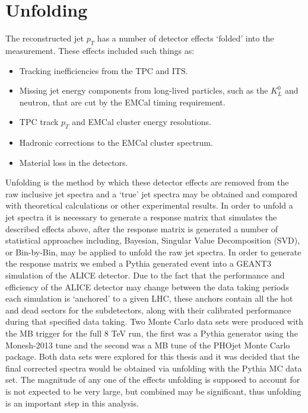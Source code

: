 \section{Unfolding}

The reconstructed jet $p_{T}$ has a number of detector effects `folded' into the measurement.  These effects included such things as:

\begin{itemize}
\item Tracking inefficiencies from the TPC and ITS.
\item Missing jet energy components from long-lived particles, such as the $K^{0}_{L}$ and neutron, that are cut by the EMCal timing requirement.
\item TPC track $p_{T}$ and EMCal cluster energy resolutions.
\item Hadronic corrections to the EMCal cluster spectrum.
\item Material loss in the detectors.
\end{itemize}

\noindent
Unfolding is the method by which these detector effects are removed from the raw inclusive jet spectra and a `true' jet spectra may be obtained and compared with theoretical calculations or other experimental results.  In order to unfold a jet spectra it is necessary to generate a response matrix that simulates the described effects above, after the response matrix is generated a number of statistical approaches including, Bayesian, Singular Value Decomposition (SVD), or Bin-by-Bin, may be applied to unfold the raw jet spectra.  In order to generate the response matrix we embed a Pythia generated event into a GEANT3 simulation of the ALICE detector.  Due to the fact that the performance and efficiency of the ALICE detector may change between the data taking periods each simulation is `anchored' to a given LHC, these anchors contain all the hot and dead sectors for the subdetectors, along with their calibrated performance during that specified data taking.  Two Monte Carlo data sets were produced with the MB trigger for the full 8 TeV run, the first was a Pythia generator using the Monesh-2013 tune and the second was a MB tune of the PHOjet Monte Carlo package.  Both data sets were explored for this thesis and it was decided that the final corrected spectra would be obtained via unfolding with the Pythia MC data set.  The magnitude of any one of the effects unfolding is supposed to account for is not expected to be very large, but combined may be significant, thus unfolding is an important step in this analysis.

